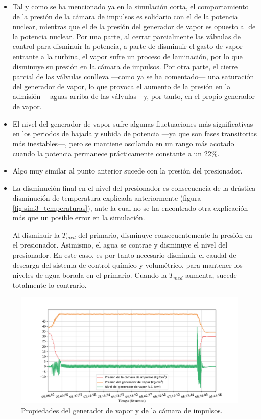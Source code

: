 \begin{itemize}
  \item Tal y como se ha mencionado ya en la simulación corta, el comportamiento de la presión de la cámara de impulsos es solidario con el de la potencia nuclear, mientras que el de la presión del generador de vapor es opuesto al de la potencia nuclear. Por una parte, al cerrar parcialmente las válvulas de control para disminuir la potencia, a parte de disminuir el gasto de vapor entrante a la turbina, el vapor sufre un proceso de laminación, por lo que disminuye su presión en la cámara de impulsos. Por otra parte, el cierre parcial de las válvulas conlleva ---como ya se ha comentado--- una saturación del generador de vapor, lo que provoca el aumento de la presión en la admisión ---aguas arriba de las válvulas---y, por tanto, en el propio generador de vapor.
  \item El nivel del generador de vapor sufre algunas fluctuaciones más significativas en los periodos de bajada y subida de potencia ---ya que son fases transitorias más inestables---, pero se mantiene oscilando en un rango más acotado cuando la potencia permanece prácticamente constante a un 22\%.
  \item Algo muy similar al punto anterior sucede con la presión del presionador.
  \item La disminución final en el nivel del presionador es consecuencia de la drástica disminución de temperatura explicada anteriormente (figura \ref{fig:sim3_temperaturas}), ante la cual no se ha encontrado otra explicación más que un posible error en la simulación. 
  
  Al disminuir la $T_{med}$ del primario, disminuye consecuentemente la presión en el presionador. Asimismo, el agua se contrae y disminuye el nivel del presionador. En este caso, es por tanto necesario disminuir el caudal de descarga del sistema de control químico y volumétrico, para mantener los niveles de agua borada en el primario. Cuando la $T_{med}$ aumenta, sucede totalmente lo contrario.
\end{itemize}

\begin{figure}[!h]
  \centering
  \includegraphics[width=\textwidth]{content/figures/sim3_gen_vapor_camara_imp.pdf}
  \caption{Propiedades del generador de vapor y de la cámara de impulsos.}
  \label{fig:sim3_gen_vapor_camara_imp}
\end{figure}


